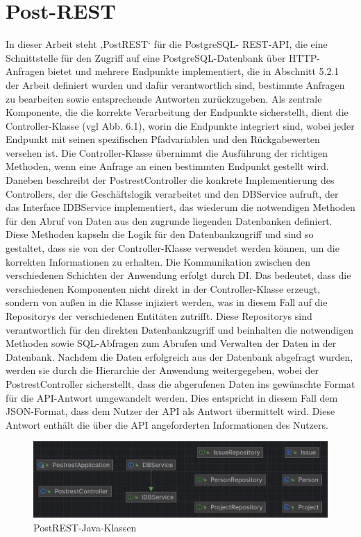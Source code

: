 
\section{Post-REST} %
\label{sec:postrest}
In dieser Arbeit steht ‚PostREST‘ für die PostgreSQL- REST-API, die eine Schnittstelle für den Zugriff auf eine PostgreSQL-Datenbank über HTTP-Anfragen bietet und mehrere Endpunkte implementiert, die in Abschnitt 5.2.1 der Arbeit definiert wurden und dafür verantwortlich sind, bestimmte Anfragen zu bearbeiten sowie entsprechende Antworten zurückzugeben. Als zentrale Komponente, die die korrekte Verarbeitung der Endpunkte sicherstellt, dient die Controller-Klasse (vgl Abb. 6.1), worin die Endpunkte integriert sind, wobei jeder Endpunkt mit seinen spezifischen Pfadvariablen und den Rückgabewerten versehen ist. Die Controller-Klasse übernimmt die Ausführung der richtigen Methoden, wenn eine Anfrage an einen bestimmten Endpunkt gestellt wird. Daneben beschreibt der PostrestController die konkrete Implementierung des Controllers, der die Geschäftslogik verarbeitet und den DBService aufruft, der das Interface IDBService implementiert, das wiederum die notwendigen Methoden für den Abruf von Daten aus den zugrunde liegenden Datenbanken definiert. Diese Methoden kapseln die Logik für den Datenbankzugriff und sind so gestaltet, dass sie von der Controller-Klasse verwendet werden können, um die korrekten Informationen zu erhalten. Die Kommunikation zwischen den verschiedenen Schichten der Anwendung erfolgt durch DI. Das bedeutet, dass die verschiedenen Komponenten nicht direkt in der Controller-Klasse erzeugt, sondern von außen in die Klasse injiziert werden, was in diesem Fall auf die Repositorys der verschiedenen Entitäten zutrifft. Diese Repositorys sind verantwortlich für den direkten Datenbankzugriff und beinhalten die notwendigen Methoden sowie SQL-Abfragen zum Abrufen und Verwalten der Daten in der Datenbank. Nachdem die Daten erfolgreich aus der Datenbank abgefragt wurden, werden sie durch die Hierarchie der Anwendung weitergegeben, wobei der PostrestController sicherstellt, dass die abgerufenen Daten ins gewünschte Format für die API-Antwort umgewandelt werden. Dies entspricht in diesem Fall dem JSON-Format, dass dem Nutzer der API als Antwort übermittelt wird. Diese Antwort enthält die über die API angeforderten Informationen des Nutzers.
\begin{figure}[H]
	\centering
	\includegraphics[scale=0.5]{Illustrations/postrest.png}
	\caption{PostREST-Java-Klassen}
\end{figure}

